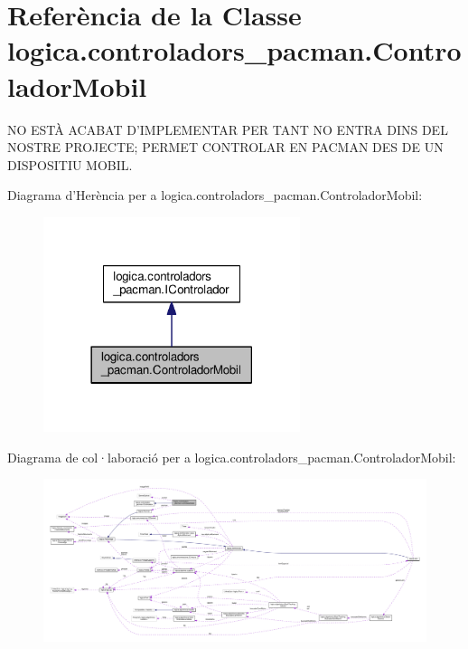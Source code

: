 \hypertarget{classlogica_1_1controladors__pacman_1_1_controlador_mobil}{\section{Referència de la Classe logica.\+controladors\+\_\+pacman.\+Controlador\+Mobil}
\label{classlogica_1_1controladors__pacman_1_1_controlador_mobil}
}


N\+O E\+S\+TÀ A\+C\+A\+B\+A\+T D'I\+M\+P\+L\+E\+M\+E\+N\+T\+A\+R P\+E\+R T\+A\+N\+T N\+O E\+N\+T\+R\+A D\+I\+N\+S D\+E\+L N\+O\+S\+T\+R\+E P\+R\+O\+J\+E\+C\+T\+E; P\+E\+R\+M\+E\+T C\+O\+N\+T\+R\+O\+L\+A\+R E\+N P\+A\+C\+M\+A\+N D\+E\+S D\+E U\+N D\+I\+S\+P\+O\+S\+I\+T\+I\+U M\+O\+B\+I\+L.  




Diagrama d'Herència per a logica.\+controladors\+\_\+pacman.\+Controlador\+Mobil\+:
\nopagebreak
\begin{figure}[H]
\begin{center}
\leavevmode
\includegraphics[width=213pt]{classlogica_1_1controladors__pacman_1_1_controlador_mobil__inherit__graph}
\end{center}
\end{figure}


Diagrama de col·laboració per a logica.\+controladors\+\_\+pacman.\+Controlador\+Mobil\+:
\nopagebreak
\begin{figure}[H]
\begin{center}
\leavevmode
\includegraphics[width=350pt]{classlogica_1_1controladors__pacman_1_1_controlador_mobil__coll__graph}
\end{center}
\end{figure}
